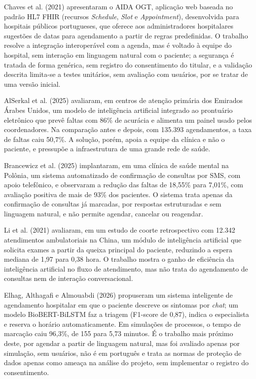 \documentclass[12pt,a4paper]{extarticle}
\begin{document}
Chaves et al. (2021) apresentaram o AIDA OGT, aplicação web baseada no padrão HL7 FHIR (recursos \textit{Schedule}, \textit{Slot} e \textit{Appointment}), desenvolvida para hospitais públicos portugueses, que oferece aos administradores hospitalares sugestões de datas para agendamento a partir de regras predefinidas. O trabalho resolve a integração interoperável com a agenda, mas é voltado à equipe do hospital, sem interação em linguagem natural com o paciente; a segurança é tratada de forma genérica, sem registro do consentimento do titular, e a validação descrita limita-se a testes unitários, sem avaliação com usuários, por se tratar de uma versão inicial.

AlSerkal et al. (2025) avaliaram, em centros de atenção primária dos Emirados Árabes Unidos, um modelo de inteligência artificial integrado ao prontuário eletrônico que prevê faltas com 86\% de acurácia e alimenta um painel usado pelos coordenadores. Na comparação antes e depois, com 135.393 agendamentos, a taxa de faltas caiu 50,7\%. A solução, porém, apoia a equipe da clínica e não o paciente, e pressupõe a infraestrutura de uma grande rede de saúde.

Brancewicz et al. (2025) implantaram, em uma clínica de saúde mental na Polônia, um sistema automatizado de confirmação de consultas por SMS, com apoio telefônico, e observaram a redução das faltas de 18,55\% para 7,01\%, com avaliação positiva de mais de 93\% dos pacientes. O sistema trata apenas da confirmação de consultas já marcadas, por respostas estruturadas e sem linguagem natural, e não permite agendar, cancelar ou reagendar.

Li et al. (2021) avaliaram, em um estudo de coorte retrospectivo com 12.342 atendimentos ambulatoriais na China, um módulo de inteligência artificial que solicita exames a partir da queixa principal do paciente, reduzindo a espera mediana de 1,97 para 0,38 hora. O trabalho mostra o ganho de eficiência da inteligência artificial no fluxo de atendimento, mas não trata do agendamento de consultas nem de interação conversacional.

Elhag, Althagafi e Almouabdi (2026) propuseram um sistema inteligente de agendamento hospitalar em que o paciente descreve os sintomas por \textit{chat}; um modelo BioBERT-BiLSTM faz a triagem (F1-score de 0,87), indica o especialista e reserva o horário automaticamente. Em simulações de processos, o tempo de marcação caiu 96,3\%, de 155 para 5,73 minutos. É o trabalho mais próximo deste, por agendar a partir de linguagem natural, mas foi avaliado apenas por simulação, sem usuários, não é em português e trata as normas de proteção de dados apenas como ameaça na análise do projeto, sem implementar o registro do consentimento.
\end{document}
